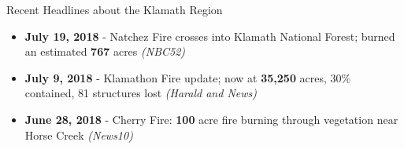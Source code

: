 \documentclass[xcolor=dvipsnames]{beamer}
\begin{document}
\begin{frame}{Recent Headlines about the Klamath Region}
\begin{itemize}
\item \textbf{July 19, 2018} - Natchez Fire crosses into Klamath National Forest; burned an estimated \textbf{767} acres \textit{(NBC52)}
\item \textbf{July \textup{  } 9, 2018} - Klamathon Fire update; now at \textbf{35,250} acres, 30\% contained, 81 structures lost \textit{(Harald and News)} 
\item \textbf{June 28, 2018} - Cherry Fire: \textbf{100 }acre fire burning through vegetation near Horse Creek \textit{(News10)}
\end{itemize}



\begin{center}


\end{center}
\end{frame}
\end{document}
